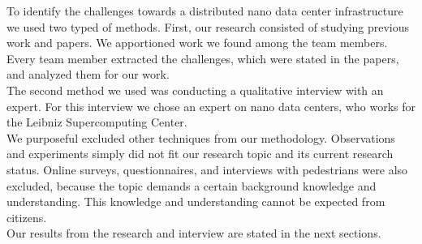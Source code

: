 
To identify the challenges towards a distributed nano data center infrastructure we used two typed of methods. First, our research consisted of studying previous work and papers. We apportioned work we found among the team members. Every team member extracted the challenges, which were stated in the papers, and analyzed them for our work. \\
The second method we used was conducting a qualitative interview with an expert. For this interview we chose an expert on nano data centers, who works for the Leibniz Supercomputing Center. \\
We purposeful excluded other techniques from our methodology. Observations and experiments simply did not fit our research topic and its current research status. Online surveys, questionnaires, and interviews with pedestrians were also excluded, because the topic demands a certain background knowledge and understanding. This knowledge and understanding cannot be expected from citizens. \\
Our results from the research and interview are stated in the next sections. 
